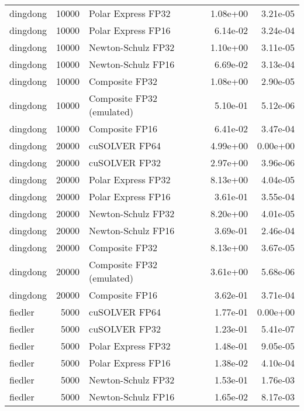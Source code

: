 \begin{table}
\begin{tabular}{lrlrr}
 dingdong & 10000 &        Polar Express FP32 &  1.08e+00 &        3.21e-05 \\
 dingdong & 10000 &        Polar Express FP16 &  6.14e-02 &        3.24e-04 \\
 dingdong & 10000 &        Newton-Schulz FP32 &  1.10e+00 &        3.11e-05 \\
 dingdong & 10000 &        Newton-Schulz FP16 &  6.69e-02 &        3.13e-04 \\
 dingdong & 10000 &            Composite FP32 &  1.08e+00 &        2.90e-05 \\
 dingdong & 10000 & Composite FP32 (emulated) &  5.10e-01 &        5.12e-06 \\
 dingdong & 10000 &            Composite FP16 &  6.41e-02 &        3.47e-04 \\
 dingdong & 20000 &             cuSOLVER FP64 &  4.99e+00 &        0.00e+00 \\
 dingdong & 20000 &             cuSOLVER FP32 &  2.97e+00 &        3.96e-06 \\
 dingdong & 20000 &        Polar Express FP32 &  8.13e+00 &        4.04e-05 \\
 dingdong & 20000 &        Polar Express FP16 &  3.61e-01 &        3.55e-04 \\
 dingdong & 20000 &        Newton-Schulz FP32 &  8.20e+00 &        4.01e-05 \\
 dingdong & 20000 &        Newton-Schulz FP16 &  3.69e-01 &        2.46e-04 \\
 dingdong & 20000 &            Composite FP32 &  8.13e+00 &        3.67e-05 \\
 dingdong & 20000 & Composite FP32 (emulated) &  3.61e+00 &        5.68e-06 \\
 dingdong & 20000 &            Composite FP16 &  3.62e-01 &        3.71e-04 \\
  fiedler &  5000 &             cuSOLVER FP64 &  1.77e-01 &        0.00e+00 \\
  fiedler &  5000 &             cuSOLVER FP32 &  1.23e-01 &        5.41e-07 \\
  fiedler &  5000 &        Polar Express FP32 &  1.48e-01 &        9.05e-05 \\
  fiedler &  5000 &        Polar Express FP16 &  1.38e-02 &        4.10e-04 \\
  fiedler &  5000 &        Newton-Schulz FP32 &  1.53e-01 &        1.76e-03 \\
  fiedler &  5000 &        Newton-Schulz FP16 &  1.65e-02 &        8.17e-03 \\

\end{tabular}
\end{table}
